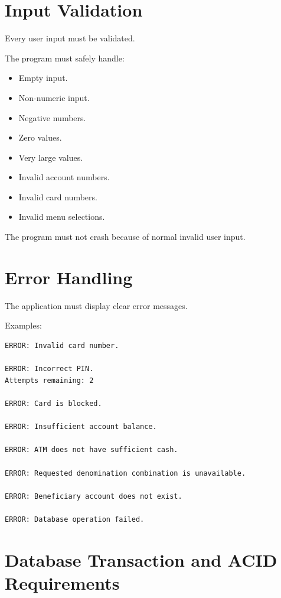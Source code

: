 \documentclass[12pt,a4paper]{article}
\begin{document}
\section{Input Validation}

Every user input must be validated.

The program must safely handle:

\begin{itemize}
    \item Empty input.
    \item Non-numeric input.
    \item Negative numbers.
    \item Zero values.
    \item Very large values.
    \item Invalid account numbers.
    \item Invalid card numbers.
    \item Invalid menu selections.
\end{itemize}

The program must not crash because of normal invalid user input.


\section{Error Handling}

The application must display clear error messages.

Examples:

\begin{verbatim}
ERROR: Invalid card number.

ERROR: Incorrect PIN.
Attempts remaining: 2

ERROR: Card is blocked.

ERROR: Insufficient account balance.

ERROR: ATM does not have sufficient cash.

ERROR: Requested denomination combination is unavailable.

ERROR: Beneficiary account does not exist.

ERROR: Database operation failed.
\end{verbatim}


\section{Database Transaction and ACID Requirements}
\end{document}
